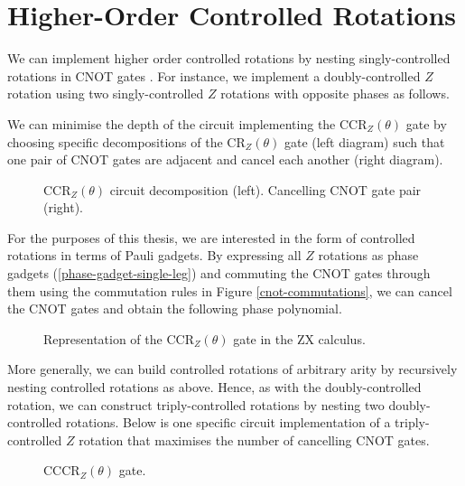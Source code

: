 \section{Higher-Order Controlled Rotations}

We can implement higher order controlled rotations by nesting singly-controlled rotations in CNOT gates \cite{Yordanov2020}. For instance, we implement a doubly-controlled $Z$ rotation using two singly-controlled $Z$ rotations with opposite phases as follows.


We can minimise the depth of the circuit implementing the CCR$_Z(\theta)$ gate by choosing specific decompositions of the CR$_Z(\theta)$ gate (left diagram) such that one pair of CNOT gates are adjacent and cancel each another (right diagram).

\begin{figure}[H]
    \centering
    \caption{CCR$_Z(\theta)$ circuit decomposition (left). Cancelling CNOT gate pair (right).}
\end{figure}

For the purposes of this thesis, we are interested in the form of controlled rotations in terms of Pauli gadgets. By expressing all $Z$ rotations as phase gadgets (\ref{phase-gadget-single-leg}) and commuting the CNOT gates through them using the commutation rules in Figure \ref{cnot-commutations}, we can cancel the CNOT gates and obtain the following phase polynomial.

\begin{figure}[H]
    \centering
    \caption{Representation of the CCR$_Z(\theta)$ gate in the ZX calculus.}
    \label{ccrz}
\end{figure}

More generally, we can build controlled rotations of arbitrary arity by recursively nesting controlled rotations as above. Hence, as with the doubly-controlled rotation, we can construct triply-controlled rotations by nesting two doubly-controlled rotations. Below is one specific circuit implementation of a triply-controlled $Z$ rotation that maximises the number of cancelling CNOT gates.

\begin{figure}[H]
    \centering
    \caption{CCCR$_Z(\theta)$ gate.}
\end{figure}

